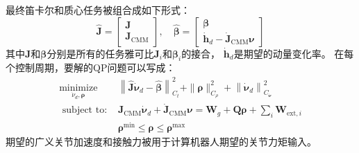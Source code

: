 最终笛卡尔和质心任务被组合成如下形式：
\begin{equation}
    \label{equ:qp_cartesian_com_task}
    \hat{\boldsymbol{J}}=\left[\begin{array}{c}
        \boldsymbol{J} \\
        \boldsymbol{J}_{\mathrm{CMM}}
        \end{array}\right], \quad \hat{\boldsymbol{\beta}}=\left[\begin{array}{c}
        \boldsymbol{\beta} \\
        \dot{\boldsymbol{h}}_d-\dot{\boldsymbol{J}}_{\mathrm{CMM}} \boldsymbol{\nu}
        \end{array}\right]
\end{equation}
其中$\boldsymbol{J}$和$\boldsymbol{\beta}$分别是所有的任务雅可比$\boldsymbol{J}_i$和$\boldsymbol{\beta}_i$的接合，
$\dot{\boldsymbol{h}}_d$是期望的动量变化率。
在每个控制周期，要解的QP问题可以写成：
\begin{equation}
    \label{equ:qp_final}
    \begin{aligned}
        \underset{\dot{\nu}_d, \boldsymbol{\rho}}{\operatorname{minimize}} & \left\|\hat{\boldsymbol{J}} \dot{\boldsymbol{\nu}}_d-\hat{\boldsymbol{\beta}}\right\|_{C_t}^2+\|\boldsymbol{\rho}\|_{C_\rho}^2+\left\|\dot{\boldsymbol{\nu}}_d\right\|_{C_{\dot{\boldsymbol{\nu}}}}^2 \\
        \text { subject to: } & \boldsymbol{J}_{\mathrm{CMM}} \dot{\boldsymbol{\nu}}_d+\dot{\boldsymbol{J}}_{\mathrm{CMM}} \boldsymbol{\nu}=\boldsymbol{W}_g+\boldsymbol{Q} \boldsymbol{\rho}+\sum_i \boldsymbol{W}_{\mathrm{ext}, i} \\
        & \boldsymbol{\rho}^{\min } \leq \boldsymbol{\rho} \leq \boldsymbol{\rho}^{\max }
        \end{aligned}
\end{equation}
期望的广义关节加速度和接触力被用于计算机器人期望的关节力矩输入。

